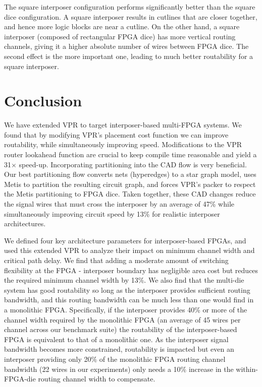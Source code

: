 \documentclass[journal]{IEEEtran}
\begin{document}
The square interposer configuration performs significantly better than the square dice configuration. A square interposer results in cutlines that are closer together, and hence more logic blocks are near a cutline. On the other hand, a square interposer (composed of rectangular FPGA dice) has more vertical routing channels, giving it a higher absolute number of wires between FPGA dice. The second effect is the more important one, leading to much better routability for a square interposer.

\section{Conclusion}
\label{conclusionSection}
We have extended VPR to target interposer-based multi-FPGA systems. We found that by modifying VPR's placement cost function we can improve routability, while simultaneously improving speed. Modifications to the VPR router lookahead function are crucial to keep compile time reasonable and yield a 31$\times$ speed-up. Incorporating partitioning into the CAD flow is very beneficial. Our best partitioning flow converts nets (hyperedges) to a star graph model, uses Metis to partition the resulting circuit graph, and forces VPR's packer to respect the Metis partitioning to FPGA dice. Taken together, these CAD changes reduce the signal wires that must cross the interposer by an average of 47\% while simultaneously improving circuit speed by 13\% for realistic interposer architectures.

We defined four key architecture parameters for interposer-based FPGAs, and used this extended VPR to analyze their impact on minimum channel width and critical path delay. We find that adding a moderate amount of switching flexibility at the FPGA - interposer boundary has negligible area cost but reduces the required minimum channel width by 13\%. We also find that the multi-die system has good routability so long as the interposer provides sufficient routing bandwidth, and this routing bandwidth can be much less than one would find in a monolithic FPGA. Specifically, if the interposer provides 40\% or more of the channel width required by the monolithic FPGA (an average of 45 wires per channel across our benchmark suite) the routability of the interposer-based FPGA is equivalent to that of a monolithic one. As the interposer signal bandwidth becomes more constrained, routability is impacted but even an interposer providing only 20\% of the monolithic FPGA routing channel bandwidth (22 wires in our experiments) only needs a 10\% increase in the within-FPGA-die routing channel width to compensate.
\end{document}
